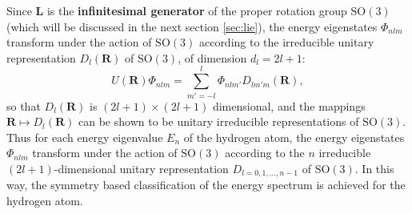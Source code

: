 Since \(\mathbf{L}\) is the \textbf{infinitesimal generator} of the proper rotation group \(\mathrm{SO}(3)\) (which will be discussed in the next section \ref{sec:lie}), the energy eigenstates \(\Phi_{n l m}\) transform under the action of \(\mathrm{SO}(3)\) according to the irreducible unitary representation \(D_l(\mathbf{R})\) of \(\mathrm{SO}(3)\), of dimension \(d_l = 2l + 1\):
\[
    U(\mathbf{R}) \Phi_{n l m} = \sum_{m'=-l}^{l} \Phi_{n l m'} D_{l m' m}(\mathbf{R}),
\]
so that \(D_l(\mathbf{R})\) is \((2l+1)\times(2l+1)\) dimensional, and the mappings \(\mathbf{R} \mapsto D_l(\mathbf{R})\) can be shown to be unitary irreducible representations of \(\mathrm{SO}(3)\). Thus for each energy eigenvalue \(E_n\) of the hydrogen atom, the energy eigenstates \(\Phi_{n l m}\) transform under the action of \(\mathrm{SO}(3)\) according to the \(n\) irreducible \((2l+1)\)-dimensional unitary representation \(D_{l=0,1,\ldots,n-1}\) of \(\mathrm{SO}(3)\). In this way, the symmetry based classification of the energy spectrum is achieved for the hydrogen atom.

